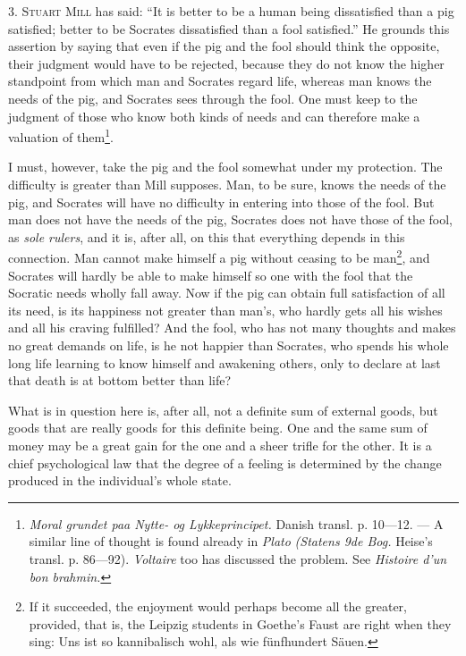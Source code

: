 \documentclass[12pt,a4paper,openany]{book}
\newcommand{\opage}[1]{\marginnote{\footnotesize\textit{[#1]}}}
\begin{document}
3. \textsc{Stuart Mill} has said: ``It is better to be a human being dissatisfied than a pig satisfied;
better to be Socrates dissatisfied than a fool satisfied.'' %
He grounds this assertion by saying that even if the pig and the fool should think the opposite, their
judgment would have to be rejected, because they do not know the higher standpoint from which man and
Socrates regard life, whereas man knows the needs of the pig, and Socrates sees through the fool. One must
keep to the judgment of those who know both kinds of needs and can therefore make a valuation of
them\footnote[1]{\textit{Moral grundet paa Nytte- og Lykkeprincipet.} Danish transl. p. 10---12. ---
A similar line of thought is found already in \emph{Plato} \textit{(Statens 9de Bog.} Heise's transl. p.
86---92). \emph{Voltaire} too has discussed the problem. See \textit{Histoire d'un bon brahmin.}}.

I must, however, take the pig and the fool somewhat under my protection. The difficulty is greater than
Mill supposes. Man, to be sure, knows the needs of the pig, and Socrates will have no difficulty in
entering into those of the fool. But man does not have the needs of the pig, Socrates does not have those
of the fool, as \textit{sole rulers}, and it is, after all, on this that everything depends in this
connection. Man cannot make himself a pig without ceasing to be man\footnote[2]{If it succeeded, the
enjoyment would perhaps become all the greater, provided, that is, the Leipzig students in Goethe's Faust
are right when they sing: Uns ist so kannibalisch wohl, als wie fünfhundert Säuen.}, and Socrates will
hardly be able to make himself
\opage{141}so one with the fool that the Socratic needs wholly fall away. Now if the pig can obtain full
satisfaction of all its need, is its happiness not greater than man's, who hardly gets all his wishes and
all his craving fulfilled? And the fool, who has not many thoughts and makes no great demands on life, is
he not happier than Socrates, who spends his whole long life learning to know himself and awakening
others, only to declare at last that death is at bottom better than life?

What is in question here is, after all, not a definite sum of external goods, but goods that are really
goods for this definite being. One and the same sum of money may be a great gain for the one and a sheer
trifle for the other. It is a chief psychological law that the degree of a feeling is determined by the
change produced in the individual's whole state.
\end{document}
